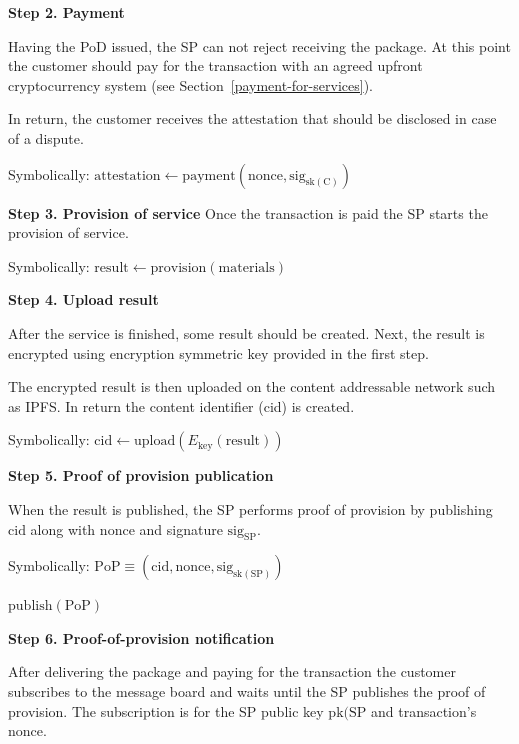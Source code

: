 \documentclass{ieeeaccess}
\begin{document}
\noindent \textbf
{Step 2. Payment}\label{step-2-payment}

Having the PoD issued, the SP can not reject receiving the package. At this point the
customer should pay for the transaction with an agreed upfront cryptocurrency system (see Section~\ref{payment-for-services}).

In return, the customer receives the $\mathrm{attestation}$ that should be disclosed in case of a dispute.

Symbolically: 
$
\mathrm{attestation} \gets \mathrm{payment}(\mathrm{nonce}, \mathrm{sig}_{\mathrm{sk}(\mathrm{C})})
$

\noindent \textbf
{Step 3. Provision of service}\label{step-3-provision-of-service} 
Once the transaction is paid the SP starts the provision of service.

Symbolically: 
$
\mathrm{result} \gets \mathrm{provision}(\mathrm{materials})
$

\noindent \textbf
{Step 4. Upload result }\label{step-4-results-upload}

After the service is finished, some result should be created. Next, the result is encrypted using encryption symmetric $\mathrm{key}$ provided in the first step.

The encrypted result is then uploaded on the content addressable network such as IPFS. In return the content identifier (cid) is created.

Symbolically: 
$
\mathrm{cid} \gets \mathrm{upload}(E_{\mathrm{key}}(\mathrm{result}))
$

\noindent \textbf
{Step 5. Proof of provision publication}\label{step-5-proof-of-provision-publication}

When the result is published, the SP performs proof of provision by publishing $\mathrm{cid}$ along with $\mathrm{nonce}$ and signature $\mathrm{sig}_\mathrm{SP}$.

Symbolically: 
$
\mathrm{PoP} \equiv (\mathrm{cid}, \mathrm{nonce}, \mathrm{sig}_{\mathrm{sk}(\mathrm{SP})})
$

$
\mathrm{publish}(\mathrm{PoP})
$

\noindent \textbf
{Step 6. Proof-of-provision notification}\label{step-6-proof-of-provision-notification}

After delivering the package and paying for the transaction the customer subscribes to the message board and waits until the SP publishes the proof of provision. The subscription is for the SP public key $\mathrm{pk}(\mathrm{SP}$ and transaction's $\mathrm{nonce}$.
\end{document}
